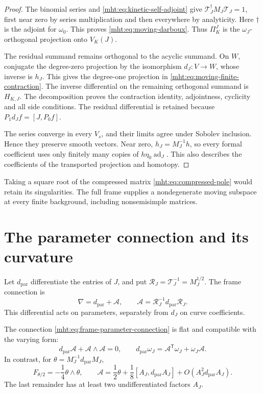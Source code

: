 \begin{proof}
The binomial series and \eqref{mht:eq:kinetic-self-adjoint} give
$\mathcal T_J^\dagger M_J\mathcal T_J=1$, first near zero by
series multiplication and then everywhere by analyticity.
Here $\dagger$ is the adjoint for $\omega_0$. This proves
\eqref{mht:eq:moving-darboux}. Thus $\Pi_K^J$ is the
$\omega_J$-orthogonal projection onto $V_K(J)$.

The residual summand remains orthogonal to the acyclic summand.
On $W$, conjugate the degree-zero projection by the isomorphism
$d_J:V\to W$, whose inverse is $h_J$. This gives the degree-one
projection in \eqref{mht:eq:moving-finite-contraction}. The inverse
differential on the remaining orthogonal summand is $H_{K,J}$.
The decomposition proves the contraction identity, adjointness,
cyclicity and all side conditions. The residual differential is
retained because $P_1d_Jf=[J,P_0f]$.

The series converge in every $V_s$, and their limits agree under
Sobolev inclusion. Hence they preserve smooth vectors. Near zero,
$h_J=M_J^{-1}h$, so every formal coefficient uses only finitely
many copies of $h\eta_0\operatorname{ad}_J$. This also describes
the coefficients of the transported projection and homotopy.
\end{proof}

Taking a square root of the compressed matrix
\eqref{mht:eq:compressed-pole} would retain its singularities.
The full frame supplies a nondegenerate moving subspace at every
finite background, including nonsemisimple matrices.

\section{The parameter connection and its curvature}

Let $d_{\mathrm{par}}$ differentiate the entries of $J$, and put
$\mathcal R_J=\mathcal T_J^{-1}=M_J^{1/2}$. The frame connection is
\begin{equation}\label{mht:eq:frame-parameter-connection}
 \nabla=d_{\mathrm{par}}+\mathcal A,
 \qquad \mathcal A=\mathcal R_J^{-1}d_{\mathrm{par}}\mathcal R_J.
\end{equation}
This differential acts on parameters, separately from $d_J$ on
curve coefficients.

\begin{proposition}\label{mht:prop:frame-connection}
The connection \eqref{mht:eq:frame-parameter-connection} is flat
and compatible with the varying form:
\[
 d_{\mathrm{par}}\mathcal A+\mathcal A\wedge\mathcal A=0,
 \qquad d_{\mathrm{par}}\omega_J
       =\mathcal A^{\mathsf T}\omega_J+\omega_J\mathcal A.
\]
In contrast, for $\theta=M_J^{-1}d_{\mathrm{par}}M_J$,
\begin{equation}\label{mht:eq:half-connection-curvature}
 F_{\theta/2}=-\frac14\theta\wedge\theta,
 \qquad
 \mathcal A=\frac12\theta+
       \frac18[A_J,d_{\mathrm{par}}A_J]
       +O(A_J^2d_{\mathrm{par}}A_J).
\end{equation}
The last remainder has at least two undifferentiated factors $A_J$.
\end{proposition}


